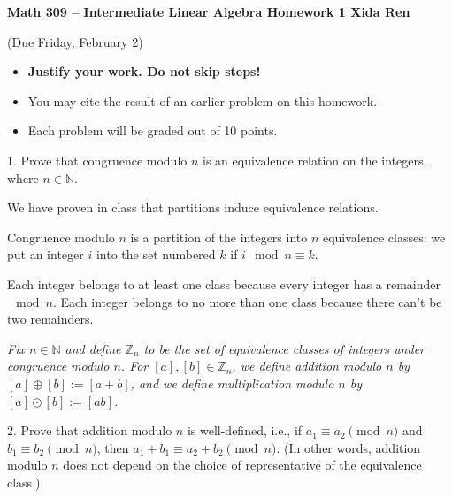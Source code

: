 \documentclass[12pt]{article} %
\newcommand{\N}{\mathbb{N}}
\newcommand{\Z}{\mathbb{Z}}
\begin{document}
\noindent
\textbf{Math 309 -- Intermediate Linear Algebra \quad
Homework 1 \hfill Xida Ren}\\
\begin{center}
  (Due Friday, February 2)
\end{center}
\medskip

\begin{flushleft}
\begin{itemize}
\item \textbf{Justify your work.  Do not skip steps!}
\item You may cite the result of an earlier problem on this homework.
\item Each problem will be graded out of 10 points.
\end{itemize}

\vspace{1cm}

1.  Prove that congruence modulo $n$ is an equivalence relation on the integers, where $n \in \N$.\\



\vspace{0.5cm}

We have proven in class that partitions induce equivalence relations. 

Congruence modulo $n$ is a partition of the integers into $n$ equivalence classes: we put an integer $i$ into the set numbered $k$ if $i \mod n \equiv k$.

Each integer belongs to at least one class because every integer has a remainder $\mod n$. Each integer belongs to no more than one class because there can't be two remainders.

\vspace{1cm}

\textit{Fix $n \in \N$ and define $\Z_n$ to be the set of equivalence classes of integers under congruence modulo $n$.  For $[a], [b] \in \Z_n$, we define addition modulo $n$ by $[a] \oplus [b] := [a+b]$, and we define multiplication modulo $n$ by $[a] \odot [b] := [ab]$.}\\

\vspace{1cm}


2.  Prove that addition modulo $n$ is well-defined, i.e., if $a_1 \equiv a_2 \pmod n$ and $b_1 \equiv b_2 \pmod n$, then $a_1 + b_1 \equiv {a_2 + b_2} \pmod n$. (In other words, addition modulo $n$ does not depend on the choice of representative of the equivalence class.)\\


\end{flushleft}
\end{document}
